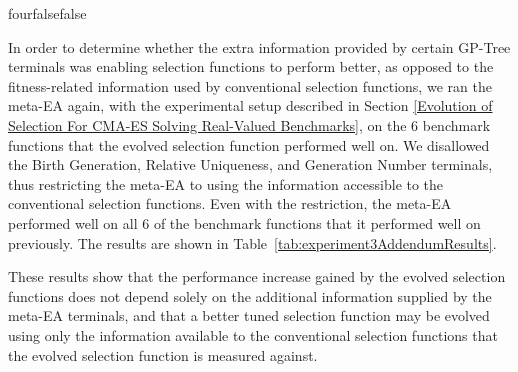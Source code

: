 \documentclass[times,12pt,titlepage]{mstogs}
\begin{document}
\begin{ThesisAppendix}{four}{false}{false}
\label{apx:exp3addendum}

In order to determine whether the extra information provided by certain GP-Tree terminals was enabling selection functions to perform better, as opposed to the fitness-related information used by conventional selection functions, we ran the meta-EA again, with the experimental setup described in Section \ref{Evolution of Selection For CMA-ES Solving Real-Valued Benchmarks}, on the 6 benchmark functions that the evolved selection function performed well on. We disallowed the Birth Generation, Relative Uniqueness, and Generation Number terminals, thus restricting the meta-EA to using the information accessible to the conventional selection functions. Even with the restriction, the meta-EA performed well on all 6 of the benchmark functions that it performed well on previously. The results are shown in Table~\ref{tab:experiment3AddendumResults}.

These results show that the performance increase gained by the evolved selection functions does not depend solely on the additional information supplied by the meta-EA terminals, and that a better tuned selection function may be evolved using only the information available to the conventional selection functions that the evolved selection function is measured against.


\end{ThesisAppendix}
\end{document}
